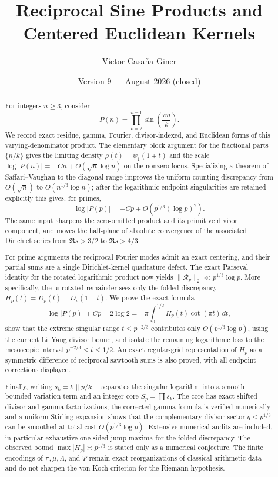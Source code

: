 \documentclass[11pt]{amsart}
\title{Reciprocal Sine Products and Centered Euclidean Kernels}
\author{V\'ictor Casa\~na-Giner}
\date{Version 9 --- August 2026 (closed)}
\numberwithin{equation}{section}
\theoremstyle{definition}
\theoremstyle{remark}
\begin{document}
\begin{abstract}
For integers \(n\geq3\), consider
\[
 P(n)=\prod_{k=2}^{n-1}\sin\!\left(\frac{\pi n}{k}\right).
\]
We record exact residue, gamma, Fourier, divisor-indexed, and Euclidean
forms of this varying-denominator product.  The elementary block argument
for the fractional parts \(\{n/k\}\) gives the limiting density
\(\rho(t)=\psi_1(1+t)\) and the scale
\(\log|P(n)|=-Cn+O(\sqrt n\log n)\) on the nonzero locus.  Specializing
a theorem of Saffari--Vaughan to the diagonal range improves the uniform
counting discrepancy from \(O(\sqrt n)\) to
\(O(n^{1/3}\log n)\); after the logarithmic endpoint singularities are
retained explicitly this gives, for primes,
\[
 \log|P(p)|=-Cp+O\!\left(p^{1/3}(\log p)^2\right).
\]
The same input sharpens the zero-omitted product and its primitive divisor
component, and moves the half-plane of absolute convergence of the
associated Dirichlet series from \(\Re s>3/2\) to \(\Re s>4/3\).

For prime arguments the reciprocal Fourier modes admit an exact centering,
and their partial sums are a single Dirichlet-kernel quadrature defect.
The exact Parseval identity for the rotated logarithmic product now yields
\(\|\mathscr R_p\|_2\ll p^{1/3}\log p\).  More specifically, the
unrotated remainder sees only the folded discrepancy
\(H_p(t)=D_p(t)-D_p(1-t)\).  We prove the exact formula
\[
 \log|P(p)|+Cp-2\log2
 =-\pi\int_0^{1/2}H_p(t)\cot(\pi t)\,dt,
\]
show that the extreme singular range \(t\le p^{-2/3}\) contributes only
\(O(p^{1/3}\log p)\), using the current Li--Yang divisor bound, and isolate
the remaining logarithmic loss to the mesoscopic interval
\(p^{-2/3}\le t\le1/2\).  An exact regular-grid representation of
\(H_p\) as a symmetric difference of reciprocal sawtooth sums is also
proved, with all endpoint corrections displayed.

Finally, writing \(s_k=k\|p/k\|\) separates the singular logarithm into a
smooth bounded-variation term and an integer core \(S_p=\prod s_k\).  The
core has exact shifted-divisor and gamma factorizations; the corrected
gamma formula is verified numerically and a uniform Stirling expansion
shows that the complementary-divisor sector \(q\le p^{1/3}\) can be
smoothed at total cost \(O(p^{1/3}\log p)\).  Extensive numerical audits
are included, in particular exhaustive one-sided jump maxima for the
folded discrepancy.  The observed bound \(\max|H_p|\asymp p^{1/3}\) is
stated only as a numerical conjecture.  The finite encodings of
\(\pi,\mu,\Lambda\), and \(\Psi\) remain exact reorganizations of classical
arithmetic data and do not sharpen the von Koch criterion for the Riemann
hypothesis.
\end{abstract}
\end{document}
